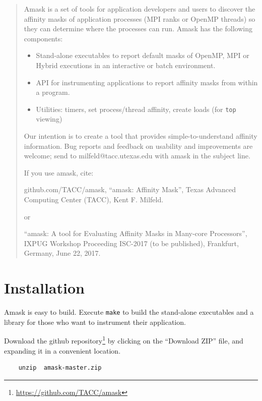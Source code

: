 \documentclass[10pt,a4paper]{report}
\begin{document}
\begin{abstract}

Amask is a set of tools for application developers and users to discover the affinity masks of application
processes (MPI ranks or OpenMP threads) so they can determine where the processes can run.
Amask has the following components:

\begin{itemize}
\item Stand-alone executables to report default masks of OpenMP, 
      MPI or Hybrid executions in an interactive or batch environment.
\item API for instrumenting applications to report affinity masks from within a program.
\item Utilities: timers, set process/thread affinity, create loads (for \verb+top+ viewing)
\end{itemize}


Our intention is to create a tool that provides simple-to-understand affinity
information. Bug reports and feedback on usability and improvements are welcome; 
send to milfeld@tacc.utexas.edu with amask in the subject line. 


If you use amask, cite:

github.com/TACC/amask, ``amask: Affinity Mask'', 
Texas Advanced Computing Center (TACC), Kent F. Milfeld. \cite{amask}

or

``amask: A tool for Evaluating Affinity Masks in Many-core Processors'', 
IXPUG Workshop Proceeding ISC-2017 (to be published), Frankfurt, Germany, June 22, 2017. 

\end{abstract}

\tableofcontents

\chapter{Installation}
Amask is easy to build. Execute \verb+make+  to build the stand-alone executables 
and a library for those who want to instrument their application.

Download the github repository\footnote{\href{https://github.com/TACC/amask}
{https://github.com/TACC/amask}} by clicking on the ``Download ZIP'' file, 
and expanding it in a convenient location.

\begin{verbatim}
    unzip  amask-master.zip
\end{verbatim}
\end{document}
